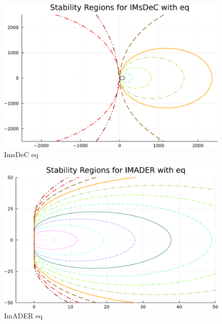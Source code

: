 \begin{figure}
\begin{minipage}[t]{0.32\textwidth}
	\includegraphics[width=\textwidth, trim={0 0 0 0}, clip]{pdf/odepics/IMsDeC_eq_ord13-crop.pdf}\\
	ImsDeC eq
	\end{minipage}
	\begin{minipage}[t]{0.32\textwidth}
		\centering
		\includegraphics[width=\textwidth, trim={0 0 0 0}, clip]{pdf/odepics/IMADER_eq_ord13-crop.pdf}\\
		ImADER eq
	\end{minipage}\\
	\begin{minipage}[t]{0.32\textwidth}
		\centering

\end{minipage}
\end{figure}
